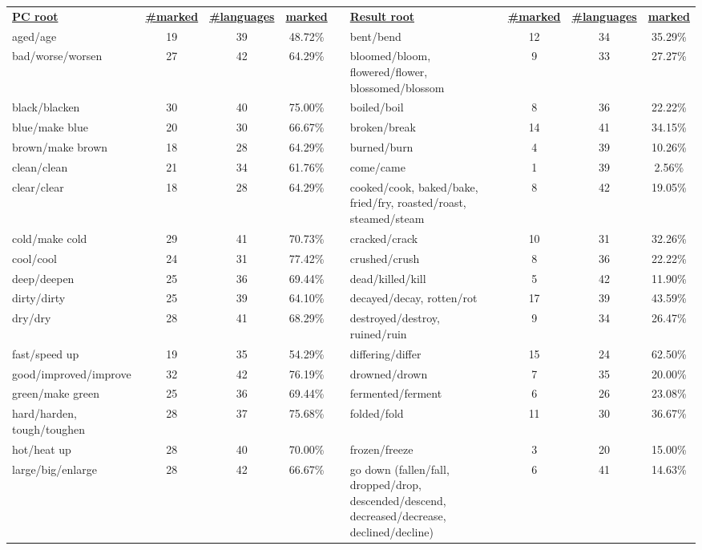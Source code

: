 \begin{tabular}{p{3cm}ccccp{3cm}ccc}
\underline{\textbf{PC root}} & \underline{\textbf{\#marked}} & \underline{\textbf{\#languages}} & \underline{\textbf{marked}} & & \underline{\textbf{Result root}} & \underline{\textbf{\#marked}} & \underline{\textbf{\#languages}} & \underline{\textbf{marked}} \\
aged/age & 19 & 39 & 48.72\% & & bent/bend & 12 & 34 & 35.29\% \\
bad/worse/worsen & 27 & 42 & 64.29\% & & bloomed/bloom, flowered/flower, blossomed/blossom & 9 & 33 & 27.27\% \\
black/blacken & 30 & 40 & 75.00\% & & boiled/boil & 8 & 36 & 22.22\% \\
blue/make blue & 20 & 30 & 66.67\% & & broken/break & 14 & 41 & 34.15\% \\
brown/make brown & 18 & 28 & 64.29\% & & burned/burn & 4 & 39 & 10.26\% \\
clean/clean & 21 & 34 & 61.76\% & & come/came & 1 & 39 & 2.56\% \\
clear/clear & 18 & 28 & 64.29\% & & cooked/cook, baked/bake, fried/fry, roasted/roast, steamed/steam & 8 & 42 & 19.05\% \\
cold/make cold & 29 & 41 & 70.73\% & & cracked/crack & 10 & 31 & 32.26\% \\
cool/cool & 24 & 31 & 77.42\% & & crushed/crush & 8 & 36 & 22.22\% \\
deep/deepen & 25 & 36 & 69.44\% & & dead/killed/kill & 5 & 42 & 11.90\% \\
dirty/dirty & 25 & 39 & 64.10\% & & decayed/decay, rotten/rot & 17 & 39 & 43.59\% \\
dry/dry & 28 & 41 & 68.29\% & & destroyed/destroy, ruined/ruin & 9 & 34 & 26.47\% \\
fast/speed up & 19 & 35 & 54.29\% & & differing/differ & 15 & 24 & 62.50\% \\
good/improved/improve & 32 & 42 & 76.19\% & & drowned/drown & 7 & 35 & 20.00\% \\
green/make green & 25 & 36 & 69.44\% & & fermented/ferment & 6 & 26 & 23.08\% \\
hard/harden, tough/toughen & 28 & 37 & 75.68\% & & folded/fold & 11 & 30 & 36.67\% \\
hot/heat up & 28 & 40 & 70.00\% & & frozen/freeze & 3 & 20 & 15.00\% \\
large/big/enlarge & 28 & 42 & 66.67\% & & go down (fallen/fall, dropped/drop, descended/descend, decreased/decrease, declined/decline) & 6 & 41 & 14.63\% \\

\end{tabular}
